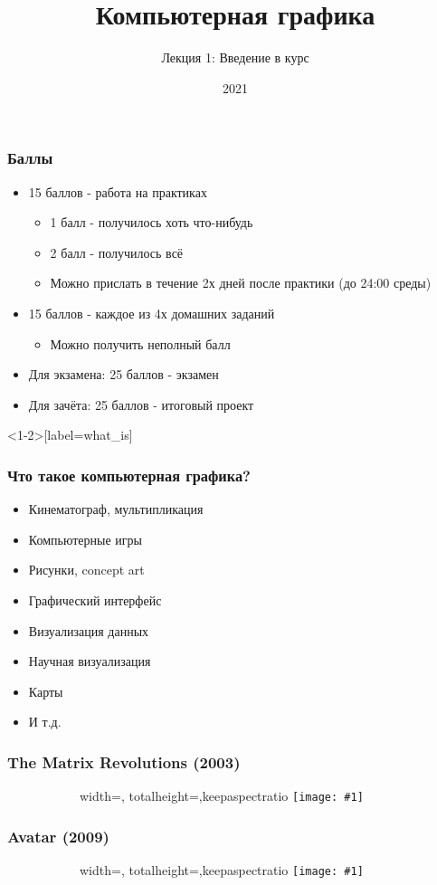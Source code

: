\documentclass{beamer}
\title{Компьютерная графика}
\subtitle{Лекция 1: Введение в курс}
\date{2021}
\newcommand{\slideimage}[1]{
  \begin{figure}
    \begin{adjustbox}{width=\textwidth, totalheight=\textheight-2\baselineskip-2\baselineskip,keepaspectratio}
      \texttt{[image: \#1]}
    \end{adjustbox}
  \end{figure}
}
\begin{document}
\frame{\titlepage}

\begin{frame}
\frametitle{Баллы}
\begin{itemize}
\pause
\item 15 баллов - работа на практиках
\pause
\begin{itemize}
\item 1 балл - получилось хоть что-нибудь
\item 2 балл - получилось всё
\pause
\item Можно прислать в течение 2х дней после практики (до 24:00 среды)
\end{itemize}
\pause
\item 15 баллов - каждое из 4х домашних заданий
\begin{itemize}
\item Можно получить неполный балл
\end{itemize}
\pause
\item Для экзамена: 25 баллов - экзамен
\pause
\item Для зачёта: 25 баллов - итоговый проект
\end{itemize}
\end{frame}

\begin{frame}<1-2>[label=what_is]
\frametitle{Что такое компьютерная графика?}
\begin{itemize}
\pause %
\item Кинематограф, мультипликация
\pause %
\item Компьютерные игры
\pause %
\item Рисунки, concept art
\pause %
\item Графический интерфейс
\pause %
\item Визуализация данных
\pause %
\item Научная визуализация
\pause %
\item Карты
\pause %
\item И т.д.
\end{itemize}
\end{frame}

\begin{frame}
\frametitle{The Matrix Revolutions (2003)}
\begin{figure}
\slideimage{matrix.jpg}
\end{figure}
\end{frame}

\begin{frame}
\frametitle{Avatar (2009)}
\begin{figure}
\slideimage{avatar.jpg}
\end{figure}
\end{frame}
\end{document}
